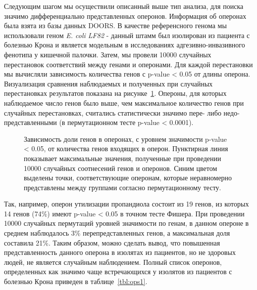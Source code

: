 Следующим шагом мы осуществили описанный выше тип анализа, для поиска значимо дифференциально представленных оперонов. Информация об оперонах была взята из базы данных DOORS. В качестве референсного генома мы использовали геном \textit{E. coli LF82} - данный штамм был изолирован из пациента с болезнью Крона и является модельным в исследованиях адгезивно-инвазивного фенотипа у кишечной палочки. Затем, мы провели 10000 случайных перестановок соответствий между генами и оперонами. Для каждой перестановки мы вычисляли зависимость количества генов с p-value < 0.05 от длины оперона. Визуализация сравнения наблюдаемых и полученных при случайных перестановках результатов показана на рисунке~\ref{img:operons_shuffle}. Опероны, для которых наблюдаемое число генов было выше, чем максимальное количество генов при случайных перестановках, считались статистически значимо пере- либо недо-представленными (в пермутационном тесте p-value < 0.0001). 

\begin{figure}[!ht] 
  \center
    \setlength{\fboxsep}{10pt}%
    \setlength{\fboxrule}{0pt}%
    \caption{Зависимость доли генов в оперонах, с уровнем значимости p-value < 0.05, от количества генов входящих в оперон. Пунктирная линия показывает максимальные значения, полученные при проведении 10000 случайных соотнесений генов и оперонов. Синим цветом выделены точки, соответствующие оперонам, которые неравномерно представлены между группами согласно пермутационному тесту.}
    \label{img:operons_shuffle}
\end{figure}

Так, например, оперон утилизации пропандиола состоит из 19 генов, из которых 14 генов (74\%) имеют p-value < 0.05 в точном тесте Фишера. При проведении 10000 случайных пермутаций уровней значимости по генам, в данном опероне в среднем наблюдалось 3\% перепредставленных генов, а максимальная доля составила 21\%. Таким образом, можно сделать вывод, что повышенная представленность данного оперона в изолятах из пациентов, но не здоровых людей, не является случайным наблюдением. Полный список оперонов, определенных как значимо чаще встречающихся у изолятов из пациентов с болезнью Крона приведен в таблице~\ref{tbl:ops1}. 

